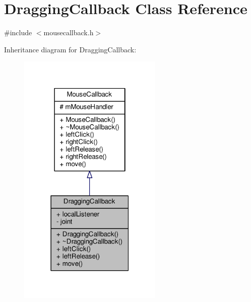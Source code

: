 \hypertarget{classDraggingCallback}{}\section{Dragging\+Callback Class Reference}
\label{classDraggingCallback}


{\ttfamily \#include $<$mousecallback.\+h$>$}



Inheritance diagram for Dragging\+Callback\+:
\nopagebreak
\begin{figure}[H]
\begin{center}
\leavevmode
\includegraphics[width=195pt]{classDraggingCallback__inherit__graph}
\end{center}
\end{figure}


